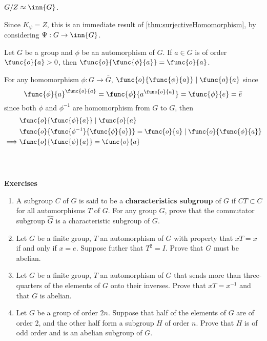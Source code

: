 \begin{lemma}
    \( G/Z\approx \inn{G}\).
\end{lemma}

\begin{prooflemma}
    Since \(K_{\psi} = Z\), this is an immediate result of \ref{thm:surjectiveHomomorphism}, by considering \(\Psi:G \to \inn{G}\).
\end{prooflemma}

\begin{lemma}
    Let \(G\) be a group and \(\phi\) be an automorphism of \(G\). If \(a \in G\) is of order \(\func{o}{a} > 0\), then \(\func{o}{\func{\phi}{a}} = \func{o}{a}\).
\end{lemma}

\begin{prooflemma}
    For any homomorphism \(\phi:G \to \bar{G}\), \(\func{o}{\func{\phi}{a}} \mid \func{o}{a}\) since 
    \begin{equation*}
        \func{\phi}{a}^{\func{o}{a}}= \func{\phi}{a^{\func{o}{a}}} = \func{\phi}{e} = \bar{e}
    \end{equation*}
    since both \(\phi\) and \(\phi^{-1}\) are homomorphism from \(G\) to \(G\), then 
    \begin{align*}
        &\func{o}{\func{\phi}{a}} \mid \func{o}{a}\\
        &\func{o}{\func{\phi^{-1}}{\func{\phi}{a}}} = \func{o}{a} \mid \func{o}{\func{\phi}{a}}\\
        \implies & \func{o}{\func{\phi}{a}} = \func{o}{a}
    \end{align*}
    \
\end{prooflemma}
\ \\ 
{\Large{\textbf{Exercises}}}
\begin{enumerate}
    \item A subgroup \(C\) of \(G\) is said to be a \textbf{characteristics subgroup} of \(G\) if \(CT \subset C\) for all automorphisms \(T\) of \(G\).    For any group \(G\), prove that the commutator subgroup \(\hat{G}\) is a characteristic subgroup of \(G\).
    \item Let \(G\) be a finite group, \(T\) an automorphism of \(G\) with property that \(xT=x\) if and only if \(x = e\). Suppose futher that \(T^2 = I\). Prove that \(G\) must be abelian.
    \item Let \(G\) be a finite group, \(T\) an automorphism of \(G\) that sends more than three-quarters of the elements of \(G\) onto their inverses. Prove that  \(xT = x^{-1}\) and that \(G\) is abelian.
    \item Let \(G\) be a group of order \(2n\). Suppose that half of the elements of \(G\) are of order \(2\), and the other half form a subgroup \(H\) of order \(n\). Prove that \(H\) is of odd order and is an abelian subgroup of \(G\).
\end{enumerate}
